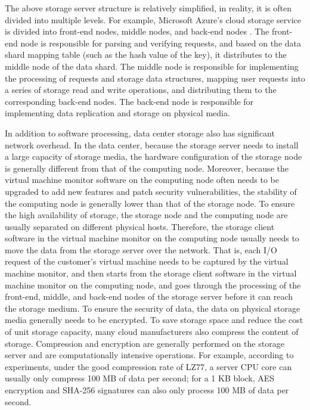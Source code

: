 The above storage server structure is relatively simplified, in reality, it is often divided into multiple levels. For example, Microsoft Azure's cloud storage service is divided into front-end nodes, middle nodes, and back-end nodes \cite{calder2011windows}. The front-end node is responsible for parsing and verifying requests, and based on the data shard mapping table (such as the hash value of the key), it distributes to the middle node of the data shard. The middle node is responsible for implementing the processing of requests and storage data structures, mapping user requests into a series of storage read and write operations, and distributing them to the corresponding back-end nodes. The back-end node is responsible for implementing data replication and storage on physical media.

In addition to software processing, data center storage also has significant network overhead. In the data center, because the storage server needs to install a large capacity of storage media, the hardware configuration of the storage node is generally different from that of the computing node. Moreover, because the virtual machine monitor software on the computing node often needs to be upgraded to add new features and patch security vulnerabilities, the stability of the computing node is generally lower than that of the storage node. To ensure the high availability of storage, the storage node and the computing node are usually separated on different physical hosts. Therefore, the storage client software in the virtual machine monitor on the computing node usually needs to move the data from the storage server over the network. That is, each I/O request of the customer's virtual machine needs to be captured by the virtual machine monitor, and then starts from the storage client software in the virtual machine monitor on the computing node, and goes through the processing of the front-end, middle, and back-end nodes of the storage server before it can reach the storage medium. To ensure the security of data, the data on physical storage media generally needs to be encrypted. To save storage space and reduce the cost of unit storage capacity, many cloud manufacturers also compress the content of storage. Compression and encryption are generally performed on the storage server and are computationally intensive operations. For example, according to experiments, under the good compression rate of LZ77, a server CPU core can usually only compress 100 MB of data per second; for a 1 KB block, AES encryption and SHA-256 signatures can also only process 100 MB of data per second.


